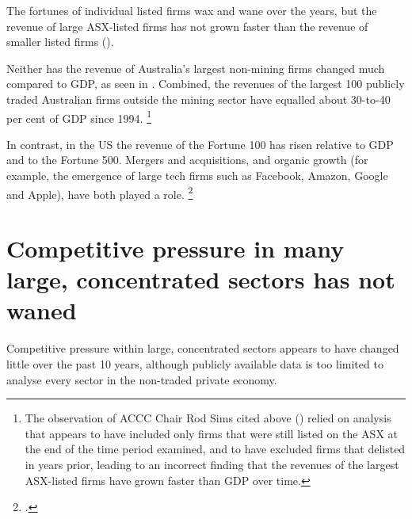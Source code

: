 The fortunes of individual listed firms wax and wane over the years, but the revenue of large ASX-listed firms has not grown faster than the revenue of smaller listed firms ().


Neither has the revenue of Australia's largest non-mining firms changed much compared to GDP, as seen in . Combined, the revenues of the largest 100 publicly traded Australian firms outside the mining sector have equalled about 30-to-40 per cent of GDP since 1994.%
    \footnote{The observation of ACCC Chair Rod Sims cited above (\textcite{Sims-2016-Keynote-RBB-Concentration}) relied on analysis that appears to have included only firms that were still listed on the ASX at the end of the time period examined, and to have excluded firms that delisted in years prior, leading to an incorrect finding that the revenues of the largest ASX-listed firms have grown faster than GDP over time.}



In contrast, in the US the revenue of the Fortune 100 has risen relative to GDP and to the Fortune 500. Mergers and acquisitions, and organic growth (for example, the emergence of large tech firms such as Facebook, Amazon, Google and Apple), have both played a role.%
    \footcite{Econsuperstar2016}


\section{Competitive pressure in many large, concentrated sectors has not waned}

Competitive pressure within large, concentrated sectors appears to have changed little over the past 10 years, although publicly available data is too limited to analyse every sector in the non-traded private economy.

